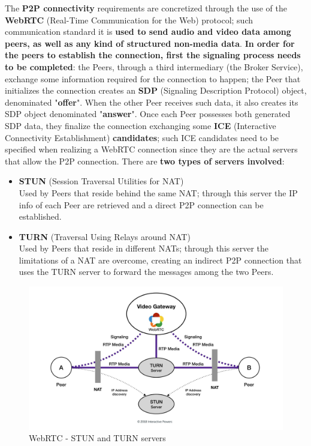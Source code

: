 The \textbf{P2P connectivity} requirements are concretized through the use of the \textbf{WebRTC} (Real-Time Communication for the Web) protocol; such communication standard it is \textbf{used to send audio and video data among peers, as well as any kind of structured non-media data}. \textbf{In order for the peers to establish the connection, first the signaling process needs to be completed}: the Peers, through a third intermediary (the Broker Service), exchange some information required for the connection to happen; the Peer that initializes the connection creates an \textbf{SDP} (Signaling Description Protocol) object, denominated "\textbf{offer}". When the other Peer receives such data, it also creates its SDP object denominated "\textbf{answer}". Once each Peer possesses both generated SDP data, they finalize the connection exchanging some \textbf{ICE} (Interactive Connectivity Establishment) \textbf{candidates}; such ICE candidates need to be specified when realizing a WebRTC connection since they are the actual servers that allow the P2P connection. There are \textbf{two types of servers involved}:
\begin{itemize}
    \item \textbf{STUN} (Session Traversal Utilities for NAT)\\
    Used by Peers that reside behind the same NAT; through this server the IP info of each Peer are retrieved and a direct P2P connection can be established.
    \item \textbf{TURN} (Traversal Using Relays around NAT)\\
    Used by Peers that reside in different NATs; through this server the limitations of a NAT are overcome, creating an indirect P2P connection that uses the TURN server to forward the messages among the two Peers.
\end{itemize}

\begin{figure}[!ht]
    \centering
    \includegraphics[scale=0.15]{document/chapters/chapter_7/images/webrtc.jpeg}
    \caption{WebRTC - STUN and TURN servers \cite{stun_and_turn_servers}}
    \label{fig:webrtc}
\end{figure}

